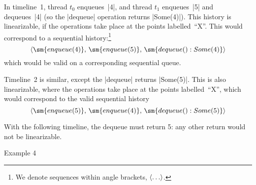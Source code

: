 
In timeline~1, thread $t_0$ enqueues~|4|, and thread $t_1$ enqueues~|5| and
dequeues~|4| (so the |dequeue| operation returns |Some(4)|).   This history is
linearizable, if the operations take place at the points
labelled~``{\scalashape X}''.  This would correspond to a sequential
history:\footnote{We denote sequences within angle brackets, ${\langle\ldots\rangle}$.}
\[
\seq{ \sm{enqueue(4)},\, \sm{enqueue(5)},\, \sm{dequeue():Some(4)}}
\]
which would be valid on a corresponding sequential queue.


Timeline~2 is similar, except the |dequeue| returns |Some(5)|.  This is also
linearizable, where the operations take place at the points
labelled~``{\scalashape X}'', which would correspond to the valid sequential history
\[
\seq{ \sm{enqueue(5)},\, \sm{enqueue(4)},\, \sm{dequeue():Some(5)}}
\]



With the following timeline, the dequeue must return 5: any other return would
not be linearizable.
%

Example 4




